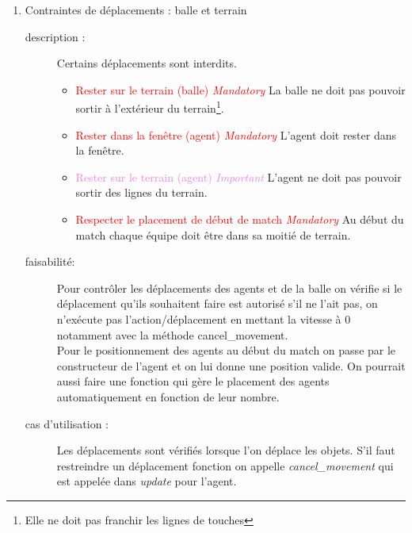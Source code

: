 \documentclass[11pt, a4paper]{article}
\newcommand{\besoinVItem}[4]{
	\item #1
	\begin{description}
		\item[description :]
		#2
		\item[faisabilité: ]
		#3
		\item[cas d'utilisation :]
		#4
	\end{description}
}
\begin{document}
\begin{enumerate}
\begin{enumerate}
			\besoinVItem{Contraintes de déplacements : balle et terrain}
			{Certains déplacements sont interdits.
				\begin{itemize}
					\item \textcolor{red}{Rester sur le terrain (balle) \textit{Mandatory}} La balle ne doit pas pouvoir sortir à l'extérieur du terrain\footnote{Elle ne doit pas franchir les lignes de touches}.
					\item \textcolor{red}{Rester dans la fenêtre (agent) \textit{Mandatory}} L'agent doit rester dans la fenêtre.
					\item \textcolor{violet}{Rester sur le terrain (agent) \textit{Important}} L'agent ne doit pas pouvoir sortir des lignes du terrain.
					\item \textcolor{red}{Respecter le placement de début de match \textit{Mandatory}} Au début du match chaque équipe doit être dans sa moitié de terrain.
				\end{itemize}
			}
			{Pour contrôler les déplacements des agents et de la balle on vérifie si le déplacement qu'ils souhaitent faire est autorisé s'il ne l'ait pas, on n'exécute pas l'action/déplacement en mettant la vitesse à 0 notamment avec la méthode cancel\_movement. \\
			Pour le positionnement des agents au début du match on passe par le constructeur de l'agent et on lui donne une position valide. On pourrait aussi faire une fonction qui gère le placement des agents automatiquement en fonction de leur nombre.
			}
			{Les déplacements sont vérifiés lorsque l'on déplace les objets. S'il faut restreindre un déplacement fonction on appelle \textit{cancel\_movement} qui est appelée dans \textit{update} pour l'agent. \\}


\end{enumerate}
\end{enumerate}
\end{document}
